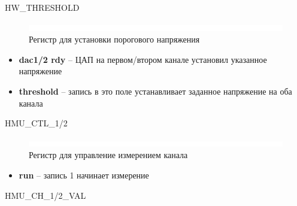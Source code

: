 \begin{register}{H}{W\_THRESHOLD}{}%
\label{example}%
%
%
%
 \regnewline%

%
%
\regnewline%
\end{register}

\begin{figure}[ht!] 
	\center
	\includegraphics  {my_folder/images//blank}
	\caption{Регистр для установки порогового напряжения} 
	\label{fig:thr-reg}  
\end{figure}
\FloatBarrier
\noindent
\begin{itemize}[label={}]
	\item \textbf{dac1/2 rdy} -- ЦАП на первом/втором канале установил указанное напряжение
	\item \textbf{threshold} -- запись в это поле устанавливает заданное напряжение на оба канала\\
\end{itemize}
\newpage
\FloatBarrier

\begin{register}{H}{MU\_CTL\_1/2}{}%
\label{example}%
%
%
 \regnewline%
\end{register}

\begin{figure}[ht!] 
	\center
	\includegraphics  {my_folder/images//blank}
	\caption{Регистр для управление измерением канала} 
	\label{fig:mu-ctl-reg}  
\end{figure}
\FloatBarrier
\begin{itemize}[label={}]
	\item \textbf{run} -- запись 1 начинает измерение\\
\end{itemize}


\begin{register}{H}{MU\_CH\_1/2\_VAL}{}%
\label{example}%
%
%
%
 \regnewline%
\end{register}

